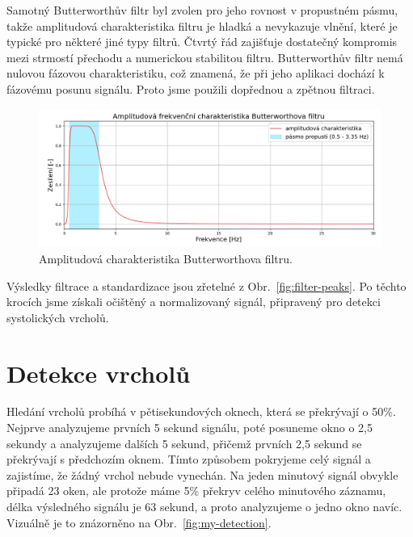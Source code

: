 Samotný Butterworthův filtr byl zvolen pro jeho rovnost v propustném pásmu, takže amplitudová charakteristika filtru je hladká a nevykazuje vlnění, které je typické pro některé jiné typy filtrů.
Čtvrtý řád zajišťuje dostatečný kompromis mezi strmostí přechodu a numerickou stabilitou filtru.
Butterworthův filtr nemá nulovou fázovou charakteristiku, což znamená, že při jeho aplikaci dochází k fázovému posunu signálu.
Proto jsme použili dopřednou a zpětnou filtraci.


\begin{figure}[h]
	\centering
	\includegraphics[width=1\textwidth]{./obrazky/My_AFC.png}
	\vspace{-5mm}
	\caption[Vlastní amplitudová charakteristika Butterworthova filtru]{Amplitudová charakteristika Butterworthova filtru.}
	\label{fig:my_AFC}
\end{figure}

Výsledky filtrace a standardizace jsou zřetelné z Obr.~\ref{fig:filter-peaks}.
Po těchto krocích jsme získali očištěný a normalizovaný signál, připravený pro detekci systolických vrcholů.

\section{Detekce vrcholů}
\label{sec:alg_peaks}
Hledání vrcholů probíhá v pětisekundových oknech, která se překrývají o 50\%.
Nejprve analyzujeme prvních 5 sekund signálu, poté posuneme okno o 2,5 sekundy a analyzujeme dalších 5 sekund, přičemž prvních 2,5 sekund se překrývají s předchozím oknem.
Tímto způsobem pokryjeme celý signál a zajistíme, že žádný vrchol nebude vynechán.
Na jeden minutový signál obvykle připadá 23 oken, ale protože máme 5\% překryv celého minutového záznamu, délka výsledného signálu je 63 sekund, a proto analyzujeme o jedno okno navíc.
Vizuálně je to znázorněno na Obr.~\ref{fig:my-detection}.

